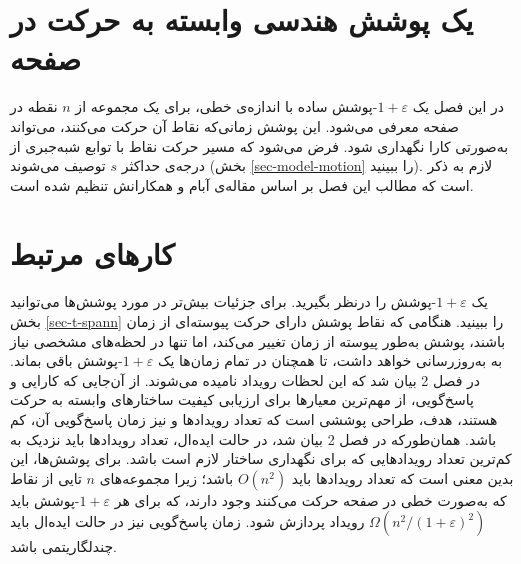  \section{ یک پوشش هندسی وابسته به حرکت در صفحه}
در این فصل یک $1 + \varepsilon$-پوشش ساده با اندازه‌ی خطی، برای یک مجموعه از $n$ نقطه در صفحه معرفی می‌شود. این پوشش زمانی‌که نقاط آن حرکت می‌کنند، می‌تواند به‌صورتی کارا نگهداری شود. فرض می‌شود که مسیر حرکت نقاط با توابع شبه‌جبری از درجه‌ی حداکثر $s$ توصیف می‌شوند (بخش \ref{sec-model-motion} را ببینید). لازم به ذکر است که مطالب این فصل بر اساس مقاله‌ی آبام و همکارانش \cite{abg-seks-10} تنظیم شده است. \section{کارهای مرتبط}
یک $1 + \varepsilon$-پوشش را درنظر بگیرید. برای جزئیات بیش‌تر در مورد پوشش‌ها می‌توانید بخش \ref{sec-t-spann} را ببینید. هنگامی که نقاط پوشش دارای حرکت پیوسته‌ای از زمان باشند، پوشش به‌طور پیوسته از زمان تغییر می‌کند، اما تنها در لحظه‌های مشخصی نیاز به به‌روزرسانی خواهد داشت، تا همچنان در تمام زمان‌ها یک $1 + \varepsilon$-پوشش باقی بماند. در فصل 2 بیان شد که این لحظات رویداد نامیده می‌شوند. از آن‌جایی که کارایی و پاسخ‌گویی، از مهم‌ترین معیارها برای ارزیابی کیفیت ساختارهای وابسته به حرکت هستند، هدف، طراحی پوششی است که تعداد رویدادها و نیز زمان پاسخ‌گویی آن، کم باشد. همان‌طورکه در فصل 2 بیان شد، در حالت ایده‌ال، تعداد رویدادها باید نزدیک به کم‌ترین تعداد رویدادهایی که برای نگهداری ساختار لازم است باشد. برای پوشش‌ها، این بدین معنی است که تعداد رویدادها باید $O(n^{2})$ باشد؛ زیرا مجموعه‌های $n$ تایی از نقاط که به‌صورت خطی در صفحه حرکت می‌کنند وجود دارند، که برای هر $1 + \varepsilon$-پوشش باید $\Omega(n^{2}/(1 + \varepsilon)^{2})$ رویداد پردازش شود.
زمان پاسخ‌گویی نیز در حالت ایده‌ال باید چندلگاریتمی باشد.

